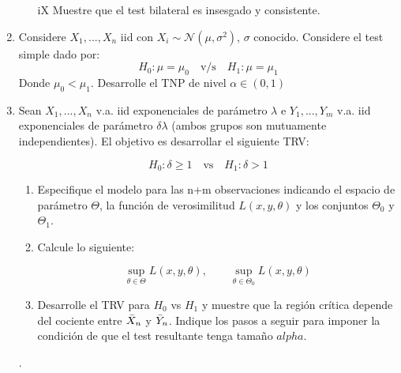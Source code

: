 \begin{enumerate}
\begin{enumerate}
    \item[iX] Muestre que el test bilateral es insesgado y consistente.
\end{enumerate}

\item Considere $X_1,...,X_n$ iid con $X_i\sim \mathcal{N}(\mu,\sigma^2)$, $\sigma$ conocido. 
Considere el test simple dado por:
\[ H_0: \mu =\mu_0 \quad \text{v/s} \quad H_1:\mu=\mu_1  \]
Donde $\mu_0<\mu_1$. Desarrolle el TNP de nivel $\alpha\in (0,1)$


\item Sean $X_1,...,X_n$ v.a. iid exponenciales de parámetro $\lambda$ e $Y_1,...,Y_m$ v.a. iid exponenciales de parámetro $\delta\lambda$ (ambos grupos son mutuamente independientes). El objetivo es desarrollar el siguiente TRV:

\[H_0:\delta\geq 1\quad \text{vs}\quad H_1:\delta >1\]

\begin{enumerate}
    \item Especifique el modelo para las n+m observaciones indicando el espacio de parámetro $\Theta$, la función de verosimilitud $L(x,y,\theta)$ y los conjuntos $\Theta_0$ y $\Theta_1$.
    
    \item Calcule lo siguiente:
    
    \[\sup\limits_{\theta\in\Theta}L(x,y,\theta), \qquad \sup\limits_{\theta\in\Theta_0}L(x,y,\theta)\]
    
    \item Desarrolle el TRV para $H_0$ vs $H_1$ y muestre que la región crítica depende del cociente entre $\Bar{X}_n$ y $\Bar{Y}_n$. Indique los pasos a seguir para imponer la condición de que el test resultante tenga tamaño $alpha$.
\end{enumerate}.


\end{enumerate}
 
 